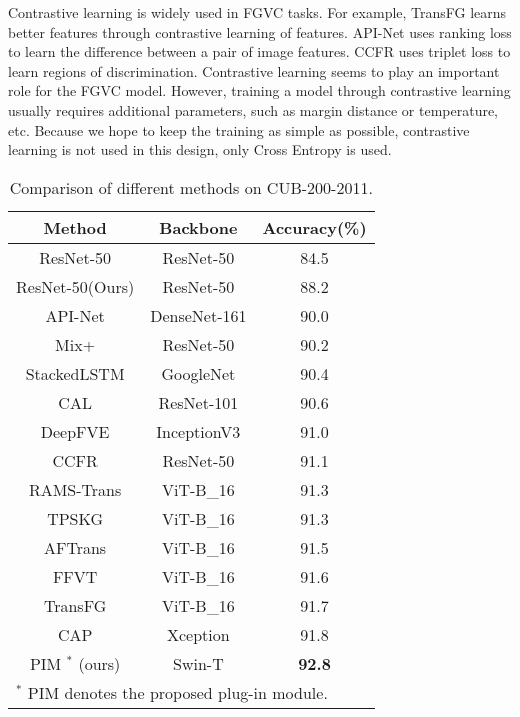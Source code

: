 \documentclass[conference]{IEEEtran}
\begin{document}
Contrastive learning is widely used in FGVC tasks. For example, TransFG\cite{TransFG} learns better features through contrastive learning of features. API-Net\cite{API_Net} uses ranking loss to learn the difference between a pair of image features. CCFR\cite{CCFR} uses triplet loss to learn regions of discrimination. Contrastive learning seems to play an important role for the FGVC model. However, training a model through contrastive learning usually requires additional parameters, such as margin distance or temperature, etc. Because we hope to keep the training as simple as possible, contrastive learning is not used in this design, only Cross Entropy is used.

\begin{table}[!tp]
\caption{Comparison of different methods on CUB-200-2011.}
\begin{center}
\begin{tabular}{c|c|c}
Method & Backbone & Accuracy(\%) \\
\hline
ResNet-50\cite{TransFG} & ResNet-50 & 84.5 \\
ResNet-50(Ours) & ResNet-50 & 88.2 \\
API-Net\cite{API_Net} & DenseNet-161 & 90.0 \\
Mix+\cite{Mix_plus} & ResNet-50 & 90.2 \\
StackedLSTM\cite{Stacked_LSTM} & GoogleNet & 90.4 \\
CAL\cite{CAL} & ResNet-101 & 90.6 \\
DeepFVE\cite{DeepFVE} & InceptionV3\cite{Inception_v3} & 91.0 \\
CCFR\cite{CCFR} & ResNet-50 & 91.1 \\
RAMS-Trans\cite{RAMS_Trans} & ViT-B\_16 & 91.3 \\
TPSKG\cite{TPSKG} & ViT-B\_16 & 91.3 \\
AFTrans\cite{AFTrans} & ViT-B\_16 & 91.5 \\
FFVT\cite{FFVT} & ViT-B\_16 & 91.6 \\
TransFG\cite{TransFG} & ViT-B\_16 & 91.7 \\
CAP\cite{CAP} & Xception\cite{Xception} & 91.8 \\
\hline
PIM $^{\mathrm{*}}$ (ours) & Swin-T & \textbf{92.8}  \\
\hline
\multicolumn{3}{l}{ $^{\mathrm{*}}$ PIM denotes the proposed plug-in module.}

\end{tabular}
\label{tab1}
\end{center}
\end{table}
\end{document}
